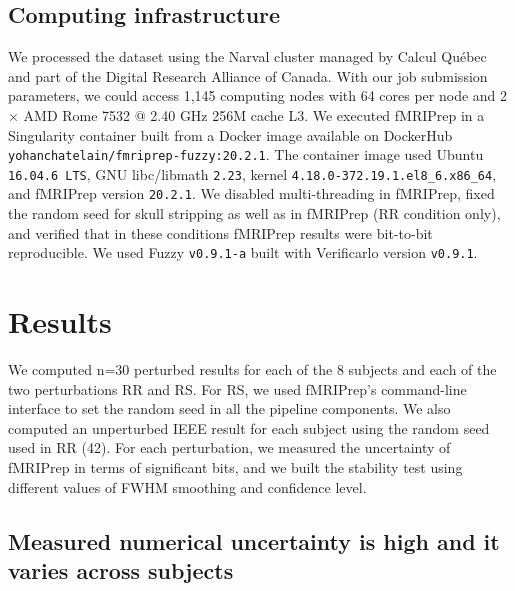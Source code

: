 \documentclass[lettersize,journal]{IEEEtran}
\newcommand{\fmriprep}{fMRIPrep\xspace}
\begin{document}
\subsection{Computing infrastructure}

We processed the dataset using the Narval cluster managed by Calcul Qu\'ebec and part of the Digital Research Alliance of Canada. With our job submission parameters, we could access 1,145 computing nodes with 64 cores per node and 2 $\times$ AMD Rome 7532 @ 2.40 GHz 256M cache L3. We executed \fmriprep in a Singularity container built from a Docker image available on DockerHub \texttt{yohanchatelain/fmriprep-fuzzy:20.2.1}. The container image used Ubuntu \texttt{16.04.6 LTS}, GNU libc/libmath \texttt{2.23}, kernel \texttt{4.18.0-372.19.1}\texttt{.el8\_6.x86\_64}, and fMRIPrep version \texttt{20.2.1}. We disabled multi-threading in fMRIPrep, fixed the random seed for skull stripping as well as in fMRIPrep (RR condition only), and verified that in these conditions fMRIPrep results were bit-to-bit reproducible.
We used Fuzzy \texttt{v0.9.1-a} built with Verificarlo version \texttt{v0.9.1}.

\section{Results}

We computed n=30 perturbed results for each of the 8 subjects and each of the two perturbations RR and RS. For RS, we used \fmriprep's command-line interface to set the random seed in all the pipeline components. We also computed an unperturbed IEEE result for each subject using the
random seed used in RR (42). For each perturbation, we measured the uncertainty of fMRIPrep in terms of significant bits, and we built the stability test using different values of FWHM smoothing and confidence level.

\subsection{Measured numerical uncertainty is high and it varies across subjects}
\end{document}
